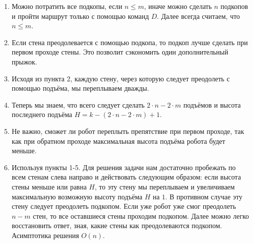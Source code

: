 \solutionSection

\begin{enumerate}
\item Можно потратить все подкопы, если $n \le m$, иначе можно сделать $n$ подкопов и пройти маршрут только с помощью команд $D$. Далее всегда считаем, что $n \le m$.
\item Если стена преодолевается с помощью подкопа, то подкоп лучше сделать при первом проходе стены. Это позволит сэкономить один дополнительный прыжок.
\item Исходя из пункта 2, каждую стену, через которую следует преодолеть с помощью подъёма, мы переплываем дважды.
\item Теперь мы знаем, что всего следует сделать $2 \cdot n - 2 \cdot m$ подъёмов и высота последнего подъёма $H = k - (2 \cdot n - 2 \cdot m) + 1$.
\item Не важно, сможет ли робот переплыть препятствие при первом проходе, так как при обратном проходе максимальная высота подъёма робота будет меньше.
\item Используя пункты 1-5. Для решения задачи нам достаточно пробежать по всем стенам слева направо и действовать следующим образом: если высота стены меньше или равна $H$, то эту стену мы переплываем и увеличиваем максимальную возможную высоту подъёма $H$ на $1$. В противном случае эту стену следует преодолеть подкопом. Если уже робот уже смог преодолеть $n - m$ стен, то все оставшиеся стены проходим подкопом. Далее можно легко восстановить ответ, зная, какие стены как преодолеваются подкопом. Асимптотика решения $O(n)$.
\end{enumerate}

\codeExample

